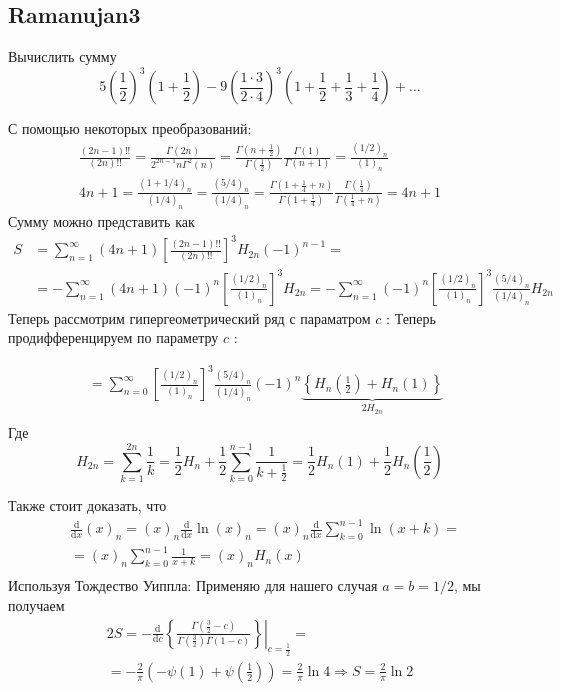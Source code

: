 	\subsection{Ramanujan3}
	Вычислить сумму
	$$
	5\left(\frac{1}{2}\right)^3\left(1+\frac{1}{2}\right)-9\left(\frac{1 \cdot 3}{2 \cdot 4}\right)^3\left(1+\frac{1}{2}+\frac{1}{3}+\frac{1}{4}\right)+\ldots
	$$
	
	С помощью некоторых преобразований:
	$$
	\begin{gathered}
		\frac{(2 n-1) ! !}{(2 n) ! !}=\frac{\Gamma(2 n)}{2^{2 n-1} n \Gamma^2(n)}=\frac{\Gamma\left(n+\frac{1}{2}\right)}{\Gamma\left(\frac{1}{2}\right)} \frac{\Gamma(1)}{\Gamma(n+1)}=\frac{(1 / 2)_n}{(1)_n} \\
		4 n+1=\frac{(1+1 / 4)_n}{(1 / 4)_n}=\frac{(5 / 4)_n}{(1 / 4)_n}=\frac{\Gamma\left(1+\frac{1}{4}+n\right)}{\Gamma\left(1+\frac{1}{4}\right)} \frac{\Gamma\left(\frac{1}{4}\right)}{\Gamma\left(\frac{1}{4}+n\right)}=4 n+1
	\end{gathered}
	$$
	Сумму можно представить как
	$$
	\begin{aligned}
		S & =\sum_{n=1}^{\infty}(4 n+1)\left[\frac{(2 n-1) ! !}{(2 n) ! !}\right]^3 H_{2 n}(-1)^{n-1}= \\
		& =-\sum_{n=1}^{\infty}(4 n+1)(-1)^n\left[\frac{(1 / 2)_n}{(1)_n}\right]^3 H_{2 n}=-\sum_{n=1}^{\infty}(-1)^n\left[\frac{(1 / 2)_n}{(1)_n}\right]^3 \frac{(5 / 4)_n}{(1 / 4)_n} H_{2 n}
	\end{aligned}
	$$
	Теперь рассмотрим гипергеометрический ряд с параматром $c$ :
	Теперь продифференцируем по параметру $c$ :
	
	$$
	\begin{aligned}
		& =\sum_{n=0}^{\infty}\left[\frac{(1 / 2)_n}{(1)_n}\right]^3 \frac{(5 / 4)_n}{(1 / 4)_n}(-1)^n \underbrace{\left\{H_n\left(\frac{1}{2}\right)+H_n(1)\right\}}_{2 H_{2 n}} \\
		&
	\end{aligned}
	$$
	Где
	$$
	H_{2 n}=\sum_{k=1}^{2 n} \frac{1}{k}=\frac{1}{2} H_n+\frac{1}{2} \sum_{k=0}^{n-1} \frac{1}{k+\frac{1}{2}}=\frac{1}{2} H_n(1)+\frac{1}{2} H_n\left(\frac{1}{2}\right)
	$$
	
	Также стоит доказать, что
	$$
	\begin{aligned}
		& \frac{\mathrm{d}}{\mathrm{d} x}(x)_n=(x)_n \frac{\mathrm{d}}{\mathrm{d} x} \ln (x)_n=(x)_n \frac{\mathrm{d}}{\mathrm{d} x} \sum_{k=0}^{n-1} \ln (x+k)= \\
		& =(x)_n \sum_{k=0}^{n-1} \frac{1}{x+k}=(x)_n H_n(x) \\
		&
	\end{aligned}
	$$
	Используя Тождество Уиппла:
	Применяю для нашего случая $a=b=1 / 2$, мы получаем
	$$
	\begin{gathered}
		2 S=-\left.\frac{\mathrm{d}}{\mathrm{d} c}\left\{\frac{\Gamma\left(\frac{3}{2}-c\right)}{\Gamma\left(\frac{3}{2}\right) \Gamma(1-c)}\right\}\right|_{c=\frac{1}{2}}= \\
		=-\frac{2}{\pi}\left(-\psi(1)+\psi\left(\frac{1}{2}\right)\right)=\frac{2}{\pi} \ln 4 \Rightarrow S=\frac{2}{\pi} \ln 2
	\end{gathered}
	$$
	
